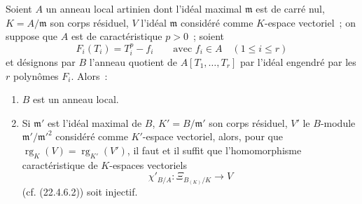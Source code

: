 \begin{proposition}[22.4.7]
\label{0.22.4.7-fr}
Soient $A$ un anneau local artinien dont l'idéal maximal $\mathfrak m$ est de
carré nul, $K=A/\mathfrak m$ son corps résiduel, $V$ l'idéal $\mathfrak m$
considéré comme $K$-espace vectoriel~; on suppose que $A$ est de
caractéristique $p>0$~; soient
\begin{equation}
\label{0.22.4.7.1-fr}
  F_i(T_i)=T_i^p-f_i\qquad\text{avec }f_i\in A\quad(1\leqslant i\leqslant r)
  \tag{22.4.7.1}
\end{equation}
et désignons par $B$ l'anneau quotient de $A[T_1,\ldots,T_r]$ par l'idéal
engendré par les $r$ polynômes $F_i$. Alors~:
\begin{enumerate}
  \item[\rm(i)] $B$ est un anneau local.
  \item[\rm(ii)] Si $\mathfrak m'$ est l'idéal maximal de $B$,
  $K'=B/\mathfrak m'$ son corps résiduel, $V'$ le $B$-module
  $\mathfrak m'/\mathfrak m'^2$ considéré comme $K'$-espace vectoriel, alors,
  pour que $\operatorname{rg}_K(V)=\operatorname{rg}_{K'}(V')$, il faut et il suffit que l'homomorphisme
  caractéristique de $K$-espaces vectoriels
  \begin{equation}
  \label{0.22.4.7.2-fr}
    \chi'_{B/A}:\Xi_{B_{(K)}/K}\longrightarrow V
    \tag{22.4.7.2}
  \end{equation}
  (cf. (22.4.6.2)) soit injectif.
\end{enumerate}
\end{proposition}

